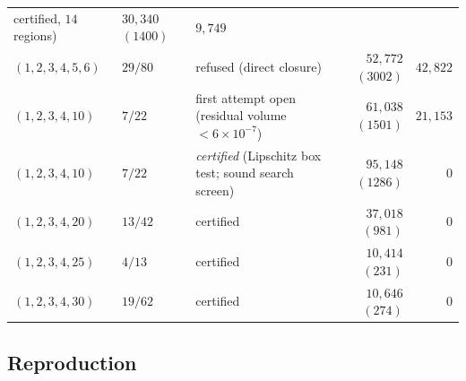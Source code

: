 \documentclass[11pt,a4paper]{article}
\numberwithin{equation}{section}
\theoremstyle{plain}
\theoremstyle{definition}
\theoremstyle{remark}
\begin{document}
\begin{table}[htbp]
\begin{tabularx}{\textwidth}{@{} l l >{\raggedright\arraybackslash}X r r @{}}
certified, $14$ regions) & $30{,}340$ $(1400)$ & $9{,}749$ \\
$(1,2,3,4,5,6)$ & $29/80$ & refused (direct closure) & $52{,}772$
$(3002)$ & $42{,}822$ \\
$(1,2,3,4,10)$ & $7/22$ & first attempt open (residual volume
$<6\times10^{-7}$) & $61{,}038$ $(1501)$ & $21{,}153$ \\
$(1,2,3,4,10)$ & $7/22$ & \emph{certified} (Lipschitz box test; sound
search screen) & $95{,}148$ $(1286)$ & $0$ \\
$(1,2,3,4,20)$ & $13/42$ & certified & $37{,}018$ $(981)$ & $0$ \\
$(1,2,3,4,25)$ & $4/13$ & certified & $10{,}414$ $(231)$ & $0$ \\
$(1,2,3,4,30)$ & $19/62$ & certified & $10{,}646$ $(274)$ & $0$ \\
\bottomrule
\end{tabularx}
\end{table}

\subsection{Reproduction}
\end{document}

